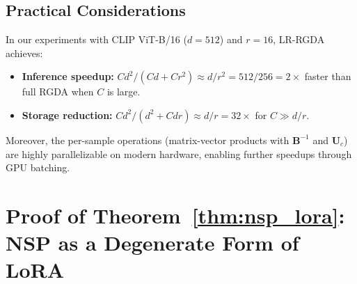 \documentclass{article}
\begin{document}
\subsection{Practical Considerations}

In our experiments with CLIP ViT-B/16 ($d = 512$) and $r = 16$, LR-RGDA achieves:
\begin{itemize}
    \item \textbf{Inference speedup:} $Cd^2 / (Cd + Cr^2) \approx d/r^2 = 512/256 = 2\times$ faster than full RGDA when $C$ is large.
    \item \textbf{Storage reduction:} $Cd^2 / (d^2 + Cdr) \approx d/r = 32\times$ for $C \gg d/r$.
\end{itemize}
Moreover, the per-sample operations (matrix-vector products with $\mathbf{B}^{-1}$ and $\mathbf{U}_c$) are highly parallelizable on modern hardware, enabling further speedups through GPU batching.

\section{Proof of Theorem~\ref{thm:nsp_lora}: NSP as a Degenerate Form of LoRA}
\label{app:thm1}
\end{document}
